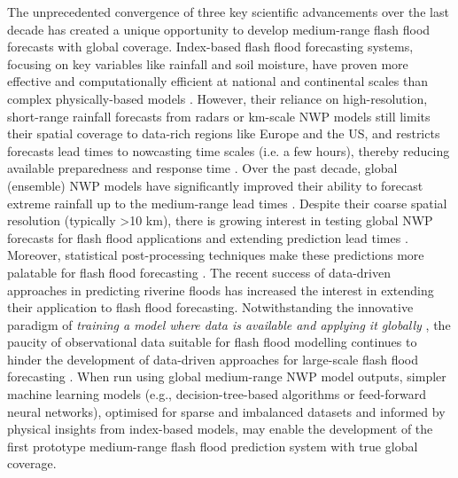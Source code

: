 The  unprecedented convergence of three key scientific advancements over the last decade has created a unique opportunity to develop medium-range flash flood forecasts with global coverage. Index-based flash flood forecasting systems, focusing on key variables like rainfall and soil moisture, have proven more effective and computationally efficient at national and continental scales than complex physically-based models  \citep{Alfieri_2015a}. However, their reliance on high-resolution, short-range rainfall forecasts from radars or km-scale NWP models still limits their spatial coverage to data-rich regions like Europe and the US, and restricts forecasts lead times to nowcasting time scales (i.e. a few hours), thereby reducing available preparedness and response time \citep{Luong_2021, Maybee_2024}. Over the past decade, global (ensemble) NWP models have significantly improved their ability to forecast extreme rainfall up to the medium-range lead times \citep{Lavers_2021, Haiden_2023}. Despite their coarse spatial resolution (typically >10 km), there is growing interest in testing global NWP forecasts for flash flood applications and extending prediction lead times \citep{Bucherie_2022b}. Moreover, statistical post-processing techniques make these predictions more palatable for flash flood forecasting \citep{Vannitsem_2021}. The recent success of data-driven approaches in predicting riverine floods \citep{Nearing_2024} has increased the interest in extending their application to flash flood forecasting. Notwithstanding the innovative paradigm of \textit{training a model where data is available and applying it globally} \citep{Kratzert_2024}, the paucity of observational data suitable for flash flood modelling continues to hinder the development of data-driven approaches for large-scale flash flood forecasting \citep{Alzubaidi_2023}. When run using global medium-range NWP model outputs, simpler machine learning models (e.g., decision-tree-based algorithms or feed-forward neural networks), optimised for sparse and imbalanced datasets and informed by physical insights from index-based models, may enable the development of the first prototype medium-range flash flood prediction system with true global coverage.


